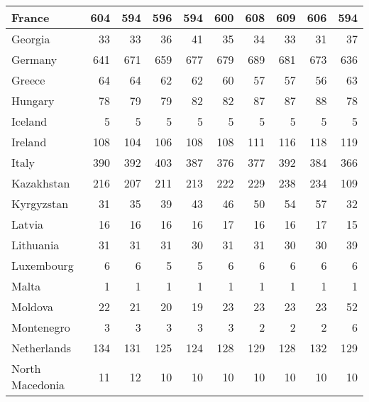 \begin{table}
\begin{tabular}{|l|r|r|r|r|r|r|r|r|r|}
                        France&    604&    594&    596&    594&    600&    608&    609&    606&    594\\\hline
                       Georgia&     33&     33&     36&     41&     35&     34&     33&     31&     37\\\hline
                       Germany&    641&    671&    659&    677&    679&    689&    681&    673&    636\\\hline
                        Greece&     64&     64&     62&     62&     60&     57&     57&     56&     63\\\hline
                       Hungary&     78&     79&     79&     82&     82&     87&     87&     88&     78\\\hline
                       Iceland&      5&      5&      5&      5&      5&      5&      5&      5&      5\\\hline
                       Ireland&    108&    104&    106&    108&    108&    111&    116&    118&    119\\\hline
                         Italy&    390&    392&    403&    387&    376&    377&    392&    384&    366\\\hline
                    Kazakhstan&    216&    207&    211&    213&    222&    229&    238&    234&    109\\\hline
                    Kyrgyzstan&     31&     35&     39&     43&     46&     50&     54&     57&     32\\\hline
                        Latvia&     16&     16&     16&     16&     17&     16&     16&     17&     15\\\hline
                     Lithuania&     31&     31&     31&     30&     31&     31&     30&     30&     39\\\hline
                    Luxembourg&      6&      6&      5&      5&      6&      6&      6&      6&      6\\\hline
                         Malta&      1&      1&      1&      1&      1&      1&      1&      1&      1\\\hline
                       Moldova&     22&     21&     20&     19&     23&     23&     23&     23&     52\\\hline
                    Montenegro&      3&      3&      3&      3&      3&      2&      2&      2&      6\\\hline
                   Netherlands&    134&    131&    125&    124&    128&    129&    128&    132&    129\\\hline
               North Macedonia&     11&     12&     10&     10&     10&     10&     10&     10&     10\\\hline

\end{tabular}
\end{table}
